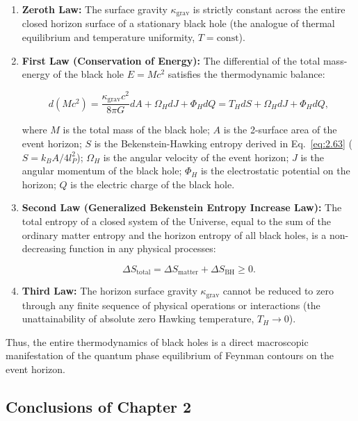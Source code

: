 \begin{enumerate}
\item \textbf{Zeroth Law:} The surface gravity $\kappa_{\text{grav}}$ is strictly constant across the entire closed horizon surface of a stationary black hole (the analogue of thermal equilibrium and temperature uniformity, $T = \text{const}$).

\item \textbf{First Law (Conservation of Energy):}  
The differential of the total mass-energy of the black hole $E = M c^2$ satisfies the thermodynamic balance:

\begin{equation}\label{eq:2.70}\label{eq:2.121}\tag{2.70}
d(M c^2) = \frac{\kappa_{\text{grav}} c^2}{8\pi G} dA + \Omega_H dJ + \Phi_H dQ = T_H dS + \Omega_H dJ + \Phi_H dQ,
\end{equation}

where $M$ is the total mass of the black hole;  
$A$ is the 2-surface area of the event horizon;  
$S$ is the Bekenstein-Hawking entropy derived in Eq.~\eqref{eq:2.63} ($S = k_B A / 4l_P^2$);  
$\Omega_H$ is the angular velocity of the event horizon;  
$J$ is the angular momentum of the black hole;  
$\Phi_H$ is the electrostatic potential on the horizon;  
$Q$ is the electric charge of the black hole.

\item \textbf{Second Law (Generalized Bekenstein Entropy Increase Law):}  
The total entropy of a closed system of the Universe, equal to the sum of the ordinary matter entropy and the horizon entropy of all black holes, is a non-decreasing function in any physical processes:

\begin{equation}\label{eq:2.71}\label{eq:2.122}\tag{2.71}
\Delta S_{\text{total}} = \Delta S_{\text{matter}} + \Delta S_{\text{BH}} \ge 0.
\end{equation}

\item \textbf{Third Law:} The horizon surface gravity $\kappa_{\text{grav}}$ cannot be reduced to zero through any finite sequence of physical operations or interactions (the unattainability of absolute zero Hawking temperature, $T_H \to 0$).
\end{enumerate}

Thus, the entire thermodynamics of black holes is a direct macroscopic manifestation of the quantum phase equilibrium of Feynman contours on the event horizon.

\subsection{Conclusions of Chapter 2}\label{sec:2.7}

